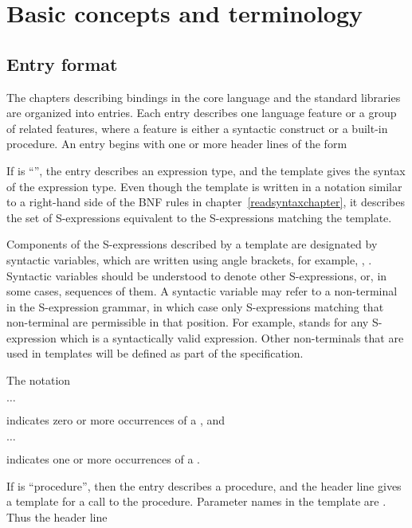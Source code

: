 \chapter{Basic concepts and terminology}
\label{basicchapter}

\section{Entry format}

The chapters describing bindings in the core language and the standard
libraries are organized
into entries.  Each entry describes one language feature or a group of
related features, where a feature is either a syntactic construct or a
built-in procedure.  An entry begins with one or more header lines of the form

\noindent{}\unpenalty

If  is ``\exprtype'', the entry describes an expression
type, and the template gives the syntax of the expression type.  Even
though the template is written in a notation similar to a right-hand
side of the BNF rules in chapter~\ref{readsyntaxchapter}, it describes
the set of S-expressions equivalent to the S-expressions matching the
template.

Components of the S-expressions described by a template are designated
by syntactic variables, which are written using angle brackets, for
example, , .  Syntactic variables
should be understood to denote other S-expressions, or, in some cases,
sequences of them.  A syntactic variable may refer to a non-terminal
in the S-expression grammar, in which case only S-expressions matching
that non-terminal are permissible in that position.  For example,
 stands for any S-expression which is a
syntactically valid expression.  Other non-terminals that are used in
templates will be defined as part of the specification.

The notation
\begin{tabbing}
\qquad {} $\ldots$
\end{tabbing}
indicates zero or more occurrences of a , and
\begin{tabbing}
\qquad {}  $\ldots$
\end{tabbing}
indicates one or more occurrences of a .

If  is ``procedure'', then the entry describes a procedure, and
the header line gives a template for a call to the procedure.  Parameter
names in the template are .  Thus the header line


